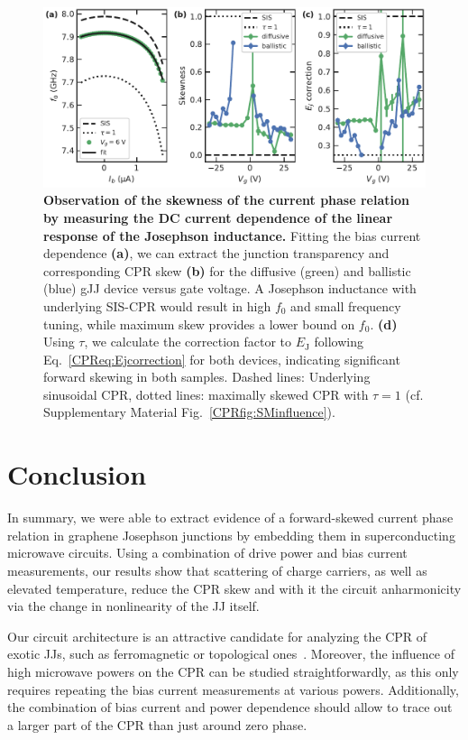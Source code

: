 \begin{figure}[t]
	\centering
	\includegraphics[width=\linewidth]{chapter-gJJ-CPR/figs/Figure4}
	\caption{
		\textbf{Observation of the skewness of the current phase relation by measuring the DC current dependence of the linear response of the Josephson inductance.}
		Fitting the bias current dependence \textbf{(a)}, we can extract the junction transparency and corresponding CPR skew \textbf{(b)} for the diffusive (green) and ballistic (blue) gJJ device versus gate voltage.
		A Josephson inductance with underlying SIS-CPR would result in high $f_0$ and small frequency tuning, while maximum skew provides a lower bound on $f_0$.
		\textbf{(d)} Using $\tau$, we calculate the correction factor to $E_\text{J}$ following Eq.~\ref{CPReq:Ejcorrection} for both devices, indicating significant forward skewing in both samples.
		Dashed lines: Underlying sinusoidal CPR, dotted lines: maximally skewed CPR with $\tau=1$ (cf. Supplementary Material Fig.~\ref{CPRfig:SMinfluence}).
	}
	\label{CPRfig:figure4}
\end{figure}

\section{Conclusion}

In summary, we were able to extract evidence of a forward-skewed current phase relation in graphene Josephson junctions by embedding them in superconducting microwave circuits.
%
Using a combination of drive power and bias current measurements, our results show that scattering of charge carriers, as well as elevated temperature, reduce the CPR skew and with it the circuit anharmonicity via the change in nonlinearity of the JJ itself.

Our circuit architecture is an attractive candidate for analyzing the CPR of exotic JJs, such as ferromagnetic or topological ones~\cite{golubovCurrentphaseRelationJosephson2004a,sochnikovNonsinusoidalCurrentPhaseRelationship2015,stoutimoreSecondHarmonicCurrentPhaseRelation2018,assoulineSpinOrbitInducedPhaseshift2019,muraniMicrowaveSignatureTopological2019}.
%
Moreover, the influence of high microwave powers on the CPR can be studied straightforwardly, as this only requires repeating the bias current measurements at various powers.
%
Additionally, the combination of bias current and power dependence should allow to trace out a larger part of the CPR than just around zero phase.

